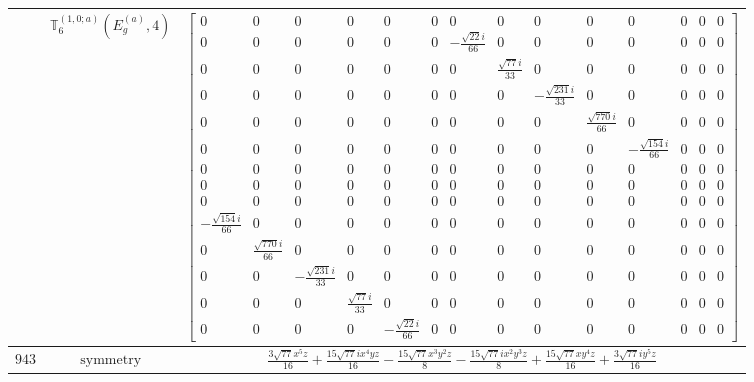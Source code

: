 \documentclass[fleqn,8pt,landscape]{jsarticle}
\begin{document}
\begin{longtable}{ccc}
$  $ & $ \mathbb{T}_{6}^{(1,0;a)}(E_{g}^{(a)},4) $ & $ \begin{bmatrix} 0 & 0 & 0 & 0 & 0 & 0 & 0 & 0 & 0 & 0 & 0 & 0 & 0 & 0 \\ 0 & 0 & 0 & 0 & 0 & 0 & - \frac{\sqrt{22} i}{66} & 0 & 0 & 0 & 0 & 0 & 0 & 0 \\ 0 & 0 & 0 & 0 & 0 & 0 & 0 & \frac{\sqrt{77} i}{33} & 0 & 0 & 0 & 0 & 0 & 0 \\ 0 & 0 & 0 & 0 & 0 & 0 & 0 & 0 & - \frac{\sqrt{231} i}{33} & 0 & 0 & 0 & 0 & 0 \\ 0 & 0 & 0 & 0 & 0 & 0 & 0 & 0 & 0 & \frac{\sqrt{770} i}{66} & 0 & 0 & 0 & 0 \\ 0 & 0 & 0 & 0 & 0 & 0 & 0 & 0 & 0 & 0 & - \frac{\sqrt{154} i}{66} & 0 & 0 & 0 \\ 0 & 0 & 0 & 0 & 0 & 0 & 0 & 0 & 0 & 0 & 0 & 0 & 0 & 0 \\ 0 & 0 & 0 & 0 & 0 & 0 & 0 & 0 & 0 & 0 & 0 & 0 & 0 & 0 \\ 0 & 0 & 0 & 0 & 0 & 0 & 0 & 0 & 0 & 0 & 0 & 0 & 0 & 0 \\ - \frac{\sqrt{154} i}{66} & 0 & 0 & 0 & 0 & 0 & 0 & 0 & 0 & 0 & 0 & 0 & 0 & 0 \\ 0 & \frac{\sqrt{770} i}{66} & 0 & 0 & 0 & 0 & 0 & 0 & 0 & 0 & 0 & 0 & 0 & 0 \\ 0 & 0 & - \frac{\sqrt{231} i}{33} & 0 & 0 & 0 & 0 & 0 & 0 & 0 & 0 & 0 & 0 & 0 \\ 0 & 0 & 0 & \frac{\sqrt{77} i}{33} & 0 & 0 & 0 & 0 & 0 & 0 & 0 & 0 & 0 & 0 \\ 0 & 0 & 0 & 0 & - \frac{\sqrt{22} i}{66} & 0 & 0 & 0 & 0 & 0 & 0 & 0 & 0 & 0 \end{bmatrix} $ \\ \hline
$ 943 $ & $ \text{symmetry} $ & $ \frac{3 \sqrt{77} x^{5} z}{16} + \frac{15 \sqrt{77} i x^{4} y z}{16} - \frac{15 \sqrt{77} x^{3} y^{2} z}{8} - \frac{15 \sqrt{77} i x^{2} y^{3} z}{8} + \frac{15 \sqrt{77} x y^{4} z}{16} + \frac{3 \sqrt{77} i y^{5} z}{16} $ \\

\end{longtable}
\end{document}
